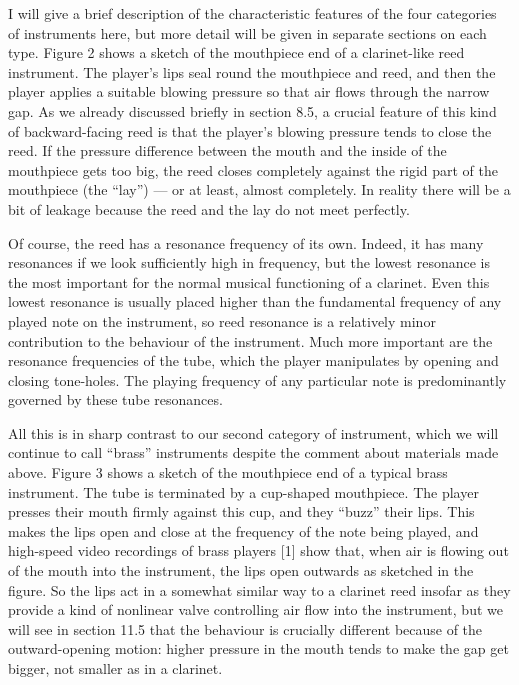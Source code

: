 
  I will give a brief description of the characteristic features of the four 
  categories of instruments here, but more detail will be given in separate 
  sections on each type. Figure 2 shows a sketch of the mouthpiece end of a 
  clarinet-like reed instrument. The player’s lips seal round the mouthpiece 
  and reed, and then the player applies a suitable blowing pressure so that air 
  flows through the narrow gap. As we already discussed briefly in section 8.5, 
  a crucial feature of this kind of backward-facing reed is that the player’s 
  blowing pressure tends to close the reed. If the pressure difference between 
  the mouth and the inside of the mouthpiece gets too big, the reed closes 
  completely against the rigid part of the mouthpiece (the “lay”) — or at 
  least, almost completely. In reality there will be a bit of leakage because 
  the reed and the lay do not meet perfectly. 

  Of course, the reed has a resonance frequency of its own. Indeed, it has many 
  resonances if we look sufficiently high in frequency, but the lowest 
  resonance is the most important for the normal musical functioning of a 
  clarinet. Even this lowest resonance is usually placed higher than the 
  fundamental frequency of any played note on the instrument, so reed resonance 
  is a relatively minor contribution to the behaviour of the instrument. Much 
  more important are the resonance frequencies of the tube, which the player 
  manipulates by opening and closing tone-holes. The playing frequency of any 
  particular note is predominantly governed by these tube resonances. 

  All this is in sharp contrast to our second category of instrument, which we 
  will continue to call “brass” instruments despite the comment about materials 
  made above. Figure 3 shows a sketch of the mouthpiece end of a typical brass 
  instrument. The tube is terminated by a cup-shaped mouthpiece. The player 
  presses their mouth firmly against this cup, and they “buzz” their lips. This 
  makes the lips open and close at the frequency of the note being played, and 
  high-speed video recordings of brass players [1] show that, when air is 
  flowing out of the mouth into the instrument, the lips open outwards as 
  sketched in the figure. So the lips act in a somewhat similar way to a 
  clarinet reed insofar as they provide a kind of nonlinear valve controlling 
  air flow into the instrument, but we will see in section 11.5 that the 
  behaviour is crucially different because of the outward-opening motion: 
  higher pressure in the mouth tends to make the gap get bigger, not smaller as 
  in a clarinet. 

